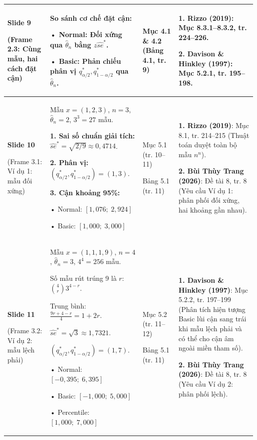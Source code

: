 \documentclass[10pt,a4paper]{article}
\begin{document}
\begin{longtable}{|>{\RaggedRight\arraybackslash}p{2.1cm}|>{\RaggedRight\arraybackslash}p{5.1cm}|>{\RaggedRight\arraybackslash}p{3.1cm}|>{\RaggedRight\arraybackslash}p{6.3cm}|}
\textbf{Slide 9}\par(Frame 2.3: Cùng mẫu, hai cách đặt cận) &
So sánh cơ chế đặt cận:\par
• Normal: Đối xứng qua $\hat\theta_n$ bằng $z\widehat{se}^*$.\par
• Basic: Phản chiếu phân vị $q_{\alpha/2}^*, q_{1-\alpha/2}^*$ qua $\hat\theta_n$. &
Mục 4.1 \& 4.2 (Bảng 4.1, tr. 9) &
\textbf{1. Rizzo (2019)}: Mục 8.3.1--8.3.2, tr. 224--226.\par
\textbf{2. Davison \& Hinkley (1997)}: Mục 5.2.1, tr. 195--198. \\
\hline

\textbf{Slide 10}\par(Frame 3.1: Ví dụ 1: mẫu đối xứng) &
Mẫu $x=(1,2,3)$, $n=3$, $\hat\theta_n=2$, $3^3=27$ mẫu.\par
\textbf{1. Sai số chuẩn giải tích:}
$\widehat{se}^* = \sqrt{2/9} \approx 0{,}4714$.\par
\textbf{2. Phân vị:} $(q_{\alpha/2}^*, q_{1-\alpha/2}^*) = (1, 3)$.\par
\textbf{3. Cận khoảng 95\%:}\par
• Normal: $[1{,}076;\; 2{,}924]$\par
• Basic: $[1{,}000;\; 3{,}000]$ &
Mục 5.1 (tr. 10--11)\par
Bảng 5.1 (tr. 11) &
\textbf{1. Rizzo (2019)}: Mục 8.1, tr. 214--215 (Thuật toán duyệt toàn bộ mẫu $n^n$).\par
\textbf{2. Bùi Thùy Trang (2026)}: Đề tài 8, tr. 8 (Yêu cầu Ví dụ 1: phân phối đối xứng, hai khoảng gần nhau). \\
\hline

\textbf{Slide 11}\par(Frame 3.2: Ví dụ 2: mẫu lệch phải) &
Mẫu $x=(1,1,1,9)$, $n=4$, $\hat\theta_n=3$, $4^4=256$ mẫu.\par
Số mẫu rút trúng 9 là $r$: $\binom{4}{r}3^{4-r}$.\par
Trung bình: $\frac{9r+4-r}{4} = 1+2r$.\par
$\widehat{se}^* = \sqrt{3} \approx 1{,}7321$.\par
$(q_{\alpha/2}^*, q_{1-\alpha/2}^*) = (1, 7)$.\par
• Normal: $[-0{,}395;\; 6{,}395]$\par
• Basic: $[-1{,}000;\; 5{,}000]$\par
• Percentile: $[1{,}000;\; 7{,}000]$ &
Mục 5.2 (tr. 11--12)\par
Bảng 5.1 (tr. 11) &
\textbf{1. Davison \& Hinkley (1997)}: Mục 5.2.2, tr. 197--199 (Phân tích hiện tượng Basic lùi cận sang trái khi mẫu lệch phải và có thể cho cận âm ngoài miền tham số).\par
\textbf{2. Bùi Thùy Trang (2026)}: Đề tài 8, tr. 8 (Yêu cầu Ví dụ 2: phân phối lệch). \\
\hline


\end{longtable}
\end{document}
